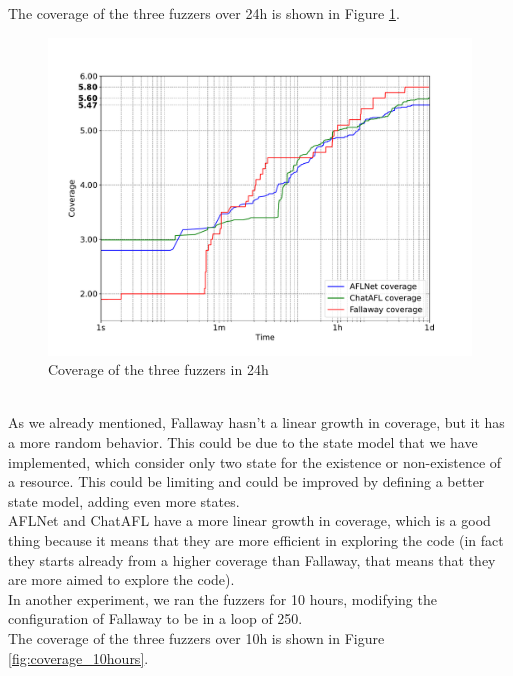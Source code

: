 The coverage of the three fuzzers over 24h is shown in Figure \ref{fig:coverage_1day}.
\begin{figure}[H]
    \centering
    \includegraphics[width=1\textwidth]{Images/coverage_over_time_lighttpd-1day.pdf}
    \caption{Coverage of the three fuzzers in 24h}
    \label{fig:coverage_1day}
\end{figure}
\phantom{}\\
As we already mentioned, Fallaway hasn't a linear growth in coverage, but it has a more random behavior. This could be due to the state model that we have implemented, which consider only two state for the existence or non-existence of a resource. This could be limiting and could be improved by defining a better state model, adding even more states.
\\AFLNet and ChatAFL have a more linear growth in coverage, which is a good thing because it means that they are more efficient in exploring the code (in fact they starts already from a higher coverage than Fallaway, that means that they are more aimed to explore the code).
\\In another experiment, we ran the fuzzers for 10 hours, modifying the configuration of Fallaway to be in a loop of 250.
\\The coverage of the three fuzzers over 10h is shown in Figure \ref{fig:coverage_10hours}.

